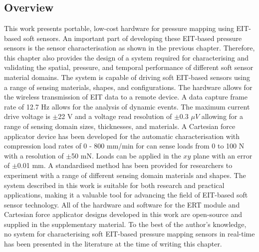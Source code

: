 \chapter{\chapvname}
\label{chapter5}
\section*{Overview}
This work presents portable, low-cost hardware for pressure mapping using EIT-based soft sensors. An important part of developing these EIT-based pressure sensors is the sensor characterisation as shown in the previous chapter. Therefore, this chapter also provides the design of a system required for characterising and validating the spatial, pressure, and temporal performance of different soft sensor material domains. The system is capable of driving soft EIT-based sensors using a range of sensing materials, shapes, and configurations. The hardware allows for the wireless transmission of EIT data to a remote device. 
A data capture frame rate of 12.7 Hz allows for the analysis of dynamic events. The maximum current drive voltage is $\pm$22 V and a voltage read resolution of $\pm$0.3 $\mu V$ allowing for a range of sensing domain sizes, thicknesses, and materials. A Cartesian force applicator device has been developed for the automatic characterisation with compression load rates of 0 - 800 mm/min for can sense loads from 0 to 100 N with a resolution of $\pm$50 mN. Loads can be applied in the $xy$ plane with an error of $\pm$0.01 mm. A standardised method has been provided for researchers to experiment with a range of different sensing domain materials and shapes. The system described in this work is suitable for both research and practical applications, making it a valuable tool for advancing the field of EIT-based soft sensor technology. All of the hardware and software for the ERT module and Cartesian force applicator designs developed in this work are open-source and supplied in the supplementary material. 
To the best of the author's knowledge, no system for characterising soft EIT-based pressure mapping sensors in real-time has been presented in the literature at the time of writing this chapter.



